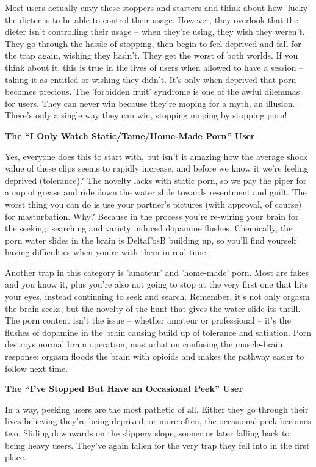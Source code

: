 \documentclass[
]{book}
\begin{document}
Most users actually envy these stoppers and starters and think about how 'lucky' the dieter is to be able to control their usage. However, they overlook that the dieter isn't controlling their usage -- when they're using, they wish they weren't. They go through the hassle of stopping, then begin to feel deprived and fall for the trap again, wishing they hadn't. They get the worst of both worlds. If you think about it, this is true in the lives of users when allowed to have a session -- taking it as entitled or wishing they didn't. It's only when deprived that porn becomes precious. The 'forbidden fruit' syndrome is one of the awful dilemmas for users. They can never win because they're moping for a myth, an illusion. There's only a single way they can win, stopping moping by stopping porn!

\textbf{The ``I Only Watch Static/Tame/Home-Made Porn'' User}

Yes, everyone does this to start with, but isn't it amazing how the average shock value of these clips seems to rapidly increase, and before we know it we're feeling deprived (tolerance)? The novelty lacks with static porn, so we pay the piper for a cup of grease and ride down the water slide towards resentment and guilt. The worst thing you can do is use your partner's pictures (with approval, of course) for masturbation. Why? Because in the process you're re-wiring your brain for the seeking, searching and variety induced dopamine flushes. Chemically, the porn water slides in the brain is DeltaFosB building up, so you'll find yourself having difficulties when you're with them in real time.

Another trap in this category is 'amateur' and 'home-made' porn. Most are fakes and you know it, plus you're also not going to stop at the very first one that hits your eyes, instead continuing to seek and search. Remember, it's not only orgasm the brain seeks, but the novelty of the hunt that gives the water slide its thrill. The porn content isn't the issue -- whether amateur or professional -- it's the flushes of dopamine in the brain causing build up of tolerance and satiation. Porn destroys normal brain operation, masturbation confusing the muscle-brain response; orgasm floods the brain with opioids and makes the pathway easier to follow next time.

\textbf{The ``I've Stopped But Have an Occasional Peek'' User}

In a way, peeking users are the most pathetic of all. Either they go through their lives believing they're being deprived, or more often, the occasional peek becomes two. Sliding downwards on the slippery slope, sooner or later falling back to being heavy users. They've again fallen for the very trap they fell into in the first place.
\end{document}
